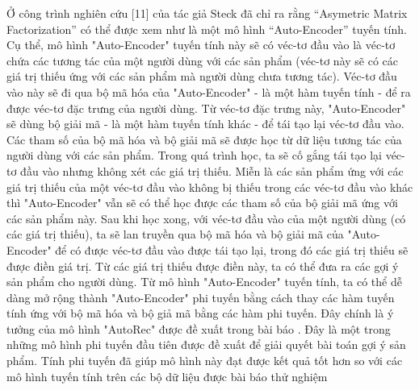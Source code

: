 Ở công trình nghiên cứu [11] của tác giả Steck đã chỉ ra rằng “Asymetric Matrix Factorization” có thể được xem như là một mô hình “Auto-Encoder” tuyến tính. 
Cụ thể, mô hình "Auto-Encoder" tuyến tính này sẽ có véc-tơ đầu vào là véc-tơ chứa các tương tác của một người dùng với các sản phẩm (véc-tơ này sẽ có các giá trị thiếu ứng với các sản phẩm mà người dùng chưa tương tác). 
Véc-tơ đầu vào này sẽ đi qua bộ mã hóa của "Auto-Encoder" - là một hàm tuyến tính - để ra được véc-tơ đặc trưng của người dùng. 
Từ véc-tơ đặc trưng này, "Auto-Encoder" sẽ dùng bộ giải mã - là một hàm tuyến tính khác - để tái tạo lại véc-tơ đầu vào. 
Các tham số của bộ mã hóa và bộ giải mã sẽ được học từ dữ liệu tương tác của người dùng với các sản phẩm. 
Trong quá trình học, ta sẽ cố gắng tái tạo lại véc-tơ đầu vào nhưng không xét các giá trị thiếu. 
Miễn là các sản phẩm ứng với các giá trị thiếu của một véc-tơ đầu vào không bị thiếu trong các véc-tơ đầu vào khác thì "Auto-Encoder" vẫn sẽ có thể học được các tham số của bộ giải mã ứng với các sản phẩm này. 
Sau khi học xong, với véc-tơ đầu vào của một người dùng (có các giá trị thiếu), ta sẽ lan truyền qua bộ mã hóa và bộ giải mã của "Auto-Encoder" để có được véc-tơ đầu vào được tái tạo lại, trong đó các giá trị thiếu sẽ được điền giá trị. 
Từ các giá trị thiếu được điền này, ta có thể đưa ra các gợi ý sản phẩm cho người dùng. 
Từ mô hình "Auto-Encoder" tuyến tính, ta có thể dễ dàng mở rộng thành "Auto-Encoder" phi tuyến bằng cách thay các hàm tuyến tính ứng với bộ mã hóa và bộ giả mã bằng các hàm phi tuyến. 
Đây chính là ý tưởng của mô hình "AutoRec" được đề xuất trong bài báo \cite{autorec}. 
Đây là một trong những mô hình phi tuyến đầu tiên được đề xuất để giải quyết bài toán gợi ý sản phẩm. 
Tính phi tuyến đã giúp mô hình này đạt được kết quả tốt hơn so với các mô hình tuyến tính trên các bộ dữ liệu được bài báo thử nghiệm


